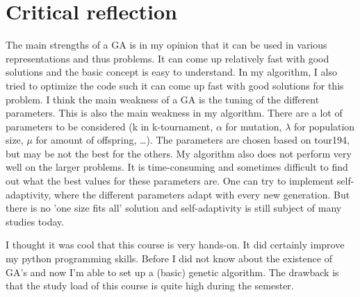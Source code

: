 \documentclass[a4paper,10pt]{article}
\newcommand{\ReplaceMe}[1]{{\color{blue}#1}}
\newcommand{\RemoveMe}[1]{{\color{purple}#1}}
\begin{document}
\section{Critical reflection}


The main strengths of a GA is in my opinion that it can be used in various representations and thus problems. It can come up relatively fast with good solutions and the basic concept is easy to understand. In my algorithm, I also tried to optimize the code such it can come up fast with good solutions for this problem.
I think the main weakness of a GA is the tuning of the different parameters. This is also the main weakness in my algorithm. There are a lot of parameters to be considered (k in k-tournament, $\alpha$ for mutation, $\lambda$ for population size, $\mu$ for amount of offspring, \ldots). The parameters are chosen based on tour194, but may be not the best for the others. My algorithm also does not perform very well on the larger problems. It is time-consuming and sometimes difficult to find out what the best values for these parameters are. One can try to implement self-adaptivity, where the different parameters adapt with every new generation. But there is no 'one size fits all' solution and self-adaptivity is still subject of many studies today. 

I thought it was cool that this course is very hands-on. It did certainly improve my python programming skills. Before I did not know about the existence of GA's and now I'm able to set up a (basic) genetic algorithm. The drawback is that the study load of this course is quite high during the semester.







\end{document}
